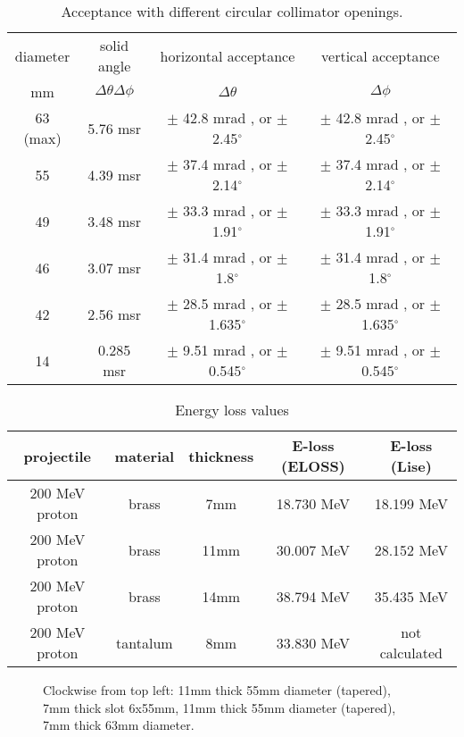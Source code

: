 \documentclass[11pt]{report}
\begin{document}
\begin{table}[!ht]
\centering
\begin{tabular}{c|c|c|c}
\hline
\hline
diameter & solid angle & horizontal acceptance & vertical acceptance\\
mm & $\Delta\theta\Delta\phi$   &  $\Delta\theta$ &  $\Delta\phi$  \\
\hline
63 (max) & 5.76 msr & $\pm$ 42.8 mrad , or $\pm$ 2.45$^{\circ}$ & $\pm$ 42.8 mrad , or $\pm$ 2.45$^{\circ}$ \\
55  & 4.39 msr & $\pm$ 37.4 mrad , or $\pm$ 2.14$^{\circ}$ & $\pm$ 37.4 mrad , or $\pm$ 2.14$^{\circ}$ \\
49  & 3.48 msr & $\pm$ 33.3 mrad , or $\pm$ 1.91$^{\circ}$ & $\pm$ 33.3 mrad , or $\pm$ 1.91$^{\circ}$ \\

46  & 3.07 msr & $\pm$  31.4 mrad , or $\pm$ 1.8$^{\circ}$ & $\pm$ 31.4 mrad , or $\pm$ 1.8$^{\circ}$ \\
42  & 2.56 msr & $\pm$  28.5 mrad , or $\pm$ 1.635$^{\circ}$ & $\pm$ 28.5 mrad , or $\pm$ 1.635$^{\circ}$ \\
14  & 0.285 msr & $\pm$  9.51 mrad , or $\pm$ 0.545$^{\circ}$ & $\pm$ 9.51 mrad , or $\pm$ 0.545$^{\circ}$ \\

\hline
\hline
\end{tabular}
\caption{Acceptance with different circular collimator openings.}
\label{table:collimators-2}
\end{table}



\begin{table}[!ht]
\centering
\begin{tabular}{c|c|c|c|c}
\hline
\hline
projectile & material & thickness & E-loss (ELOSS) & E-loss (Lise)\\
\hline
200 MeV proton & brass & 7mm  & 18.730 MeV & 18.199 MeV\\
200 MeV proton & brass & 11mm & 30.007 MeV & 28.152 MeV\\
200 MeV proton & brass & 14mm & 38.794 MeV & 35.435 MeV\\
200 MeV proton & tantalum & 8mm & 33.830 MeV & not calculated\\
\hline
\hline
\end{tabular}
\caption{Energy loss values}
\label{table:collimators-2}
\end{table}


\begin{figure}[!ht]
\centerline{\vspace{0cm}\hspace{0cm}
}
\centering
\caption{Clockwise from top left: 11mm thick 55mm diameter (tapered), 
7mm thick slot 6x55mm, 11mm thick 55mm diameter (tapered), 7mm thick 63mm diameter.}
\label{fig:inserts-1}
\end{figure} 
\end{document}

